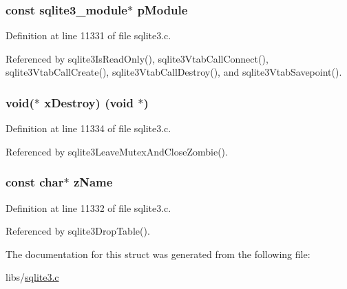 \subsubsection[{p\+Module}]{\setlength{\rightskip}{0pt plus 5cm}const {\bf sqlite3\+\_\+module}$\ast$ p\+Module}\label{struct_module_a71395f3913bd3f44e7c72118b1728f7d}


Definition at line 11331 of file sqlite3.\+c.



Referenced by sqlite3\+Is\+Read\+Only(), sqlite3\+Vtab\+Call\+Connect(), sqlite3\+Vtab\+Call\+Create(), sqlite3\+Vtab\+Call\+Destroy(), and sqlite3\+Vtab\+Savepoint().

\hypertarget{struct_module_aa4fca9e7c2c7eaf8fc25b50e9a7c1329}{}
\subsubsection[{x\+Destroy}]{\setlength{\rightskip}{0pt plus 5cm}void($\ast$ x\+Destroy) (void $\ast$)}\label{struct_module_aa4fca9e7c2c7eaf8fc25b50e9a7c1329}


Definition at line 11334 of file sqlite3.\+c.



Referenced by sqlite3\+Leave\+Mutex\+And\+Close\+Zombie().

\hypertarget{struct_module_ab014fc02d99cc45050cdfcda485c780a}{}
\subsubsection[{z\+Name}]{\setlength{\rightskip}{0pt plus 5cm}const char$\ast$ z\+Name}\label{struct_module_ab014fc02d99cc45050cdfcda485c780a}


Definition at line 11332 of file sqlite3.\+c.



Referenced by sqlite3\+Drop\+Table().



The documentation for this struct was generated from the following file\+:\begin{DoxyCompactItemize}
\item 
libs/\hyperlink{sqlite3_8c}{sqlite3.\+c}\end{DoxyCompactItemize}
